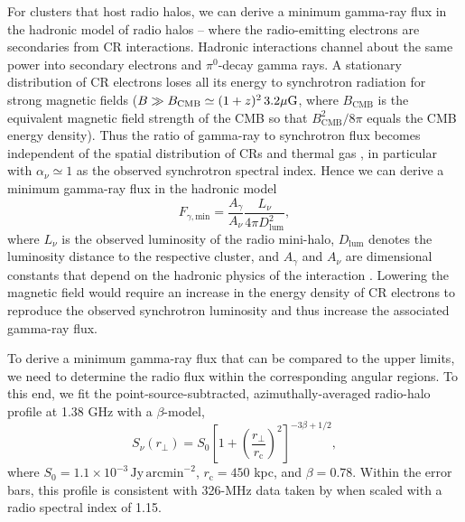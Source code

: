 \documentclass[12pt,manuscript]{aastex}
\newcommand{\rmn}{\mathrm}
\newcommand{\dps}{\displaystyle}
\begin{document}
For clusters that host radio halos, we can derive a minimum gamma-ray flux in the hadronic model of
radio halos -- where the radio-emitting electrons are secondaries from CR interactions.  Hadronic
interactions channel about the same power into secondary electrons and $\pi^{0}$-decay gamma rays. A
stationary distribution of CR electrons loses all its energy to synchrotron radiation for strong
magnetic fields ($B \gg B_\rmn{CMB} \simeq (1+z)^2\,3.2 \mu{\rm G}$, 
where $B_\rmn{CMB}$ is the equivalent magnetic
field strength of the CMB so that $B_\rmn{CMB}^2/8\pi$ equals the CMB energy density). Thus the
ratio of gamma-ray to synchrotron flux becomes independent of the spatial distribution of CRs and
thermal gas \citep{article:Voelk:1989, article:Pohl:1994, article:Pfrommer:2008}, in particular with
$\alpha_{\nu}\simeq 1$ as the observed synchrotron spectral index.  Hence we can derive a minimum
gamma-ray flux in the hadronic model
\begin{equation}
\label{eq:Fmin}
F_{\gamma,\rmn{min}} = \frac{\dps A_{\gamma}}{\dps A_{\nu}}\frac{\dps L_{\nu}}{\dps 4\pi D_{\rmn{lum}}^{2}},
\end{equation}
where $L_{\nu}$ is the observed luminosity of the radio mini-halo, $D_{\rmn{lum}}$ denotes the
luminosity distance to the respective cluster, and $A_\gamma$ and $A_\nu$ are dimensional constants
that depend on the hadronic physics of the interaction \citep{article:Pfrommer:2008,
Pfrommer_etal:2008}. Lowering the magnetic field would require an increase in the energy density of
CR electrons to reproduce the observed synchrotron luminosity and thus increase the associated
gamma-ray flux.

To derive a minimum gamma-ray flux that can be compared to the upper limits, we need to determine the
radio flux within the corresponding angular regions. To this end, we fit the
point-source-subtracted, azimuthally-averaged radio-halo profile at 1.38 GHz
\citep{article:Deiss_etal:1997} with a $\beta$-model,
\begin{equation}
\label{beta}
 S_{\nu} (r_{\bot})= S_{0} \left[ 1 + \left( \frac{r_{\bot}}{r_{\rmn{c}}}\right)^{2}\right]^{-3\beta + 1/2},
\end{equation}
where $S_{0} = 1.1 \times 10^{-3}\,\rmn{Jy\,arcmin}^{-2}$, $r_{\rmn{c}} = 450$ kpc, and
$\beta = 0.78$. Within the error bars, this profile is consistent with 326-MHz data taken by
\citet{article:Govoni_etal:2001} when scaled with a radio spectral index of 1.15.
\end{document}
